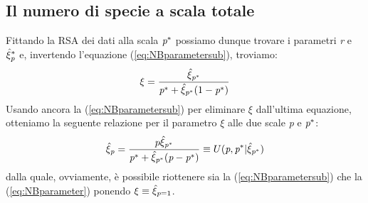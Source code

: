 \subsection{Il numero di specie a scala totale}
Fittando la RSA dei dati alla scala $\emph{p}^*$ possiamo dunque trovare i parametri \emph{r} e $\hat \xi_\emph{p}^*$ e, invertendo l'equazione (\ref{eq:NBparametersub}), troviamo:
\begin{equation}
    \xi=\frac{\hat \xi_{\emph{p}^*}}{\emph{p}^*+\hat \xi_{\emph{p}^*}(1-\emph{p}^*)}
\label{eq:NBparameter}
\end{equation}
Usando ancora la (\ref{eq:NBparametersub}) per eliminare $\xi$ dall'ultima equazione, otteniamo la seguente relazione per il parametro $\xi$ alle due scale \emph{p} e $\emph{p}^*$:
\begin{equation}
    \hat\xi_\emph{p}=\frac{p \hat \xi_{\emph{p}^*}}{\emph{p}^*+\hat\xi_{\emph{p}^*}(\emph{p}-\emph{p}^*)}\equiv U(\emph{p},\emph{p}^*|\hat \xi_{\emph{p}^*})
\end{equation}
dalla quale, ovviamente, è possibile riottenere sia la (\ref{eq:NBparametersub}) che la (\ref{eq:NBparameter}) ponendo $\xi \equiv \hat \xi_{\emph{p}=1} $.

